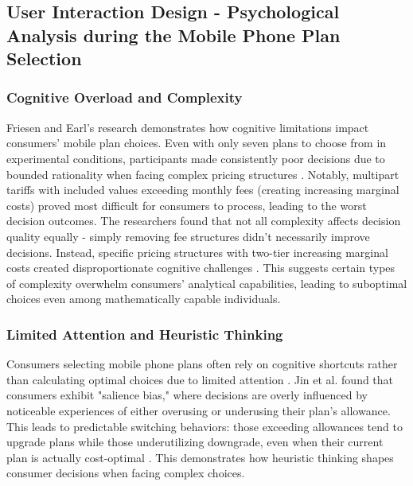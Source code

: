 \documentclass[conference]{IEEEtran}
\begin{document}
\subsection{User Interaction Design - Psychological Analysis during the Mobile Phone Plan Selection}
\subsubsection{Cognitive Overload and Complexity}
Friesen and Earl's research demonstrates how cognitive limitations impact consumers' mobile plan choices. Even with only seven plans to choose from in experimental conditions, participants made consistently poor decisions due to bounded rationality when facing complex pricing structures \cite{b1}. Notably, multipart tariffs with included values exceeding monthly fees (creating increasing marginal costs) proved most difficult for consumers to process, leading to the worst decision outcomes. The researchers found that not all complexity affects decision quality equally - simply removing fee structures didn't necessarily improve decisions. Instead, specific pricing structures with two-tier increasing marginal costs created disproportionate cognitive challenges \cite{b1}. This suggests certain types of complexity overwhelm consumers' analytical capabilities, leading to suboptimal choices even among mathematically capable individuals.
\subsubsection{Limited Attention and Heuristic Thinking}
Consumers selecting mobile phone plans often rely on cognitive shortcuts rather than calculating optimal choices due to limited attention \cite{b3}. Jin et al. found that consumers exhibit "salience bias," where decisions are overly influenced by noticeable experiences of either overusing or underusing their plan's allowance. This leads to predictable switching behaviors: those exceeding allowances tend to upgrade plans while those underutilizing downgrade, even when their current plan is actually cost-optimal \cite{b3}. This demonstrates how heuristic thinking shapes consumer decisions when facing complex choices.
\end{document}
